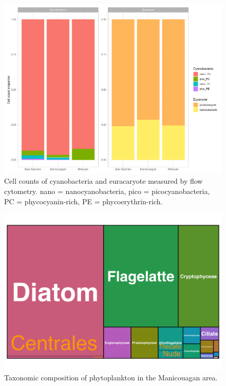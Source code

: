 \documentclass[essd, manuscript]{copernicus}
\begin{document}
\begin{figure}[t]
    \includegraphics[width=12cm]{Figures/barplot_flowcyto.png}
    \caption{Cell counts of cyanobacteria and euracaryote measured by flow cytometry. nano = nanocyanobacteria, pico =  picocyanobacteria, PC = phycocyanin-rich, PE = phycoerythrin-rich.}
    \label{fig:flowcyto}
\end{figure}

\begin{figure}[t]
    \includegraphics[width=12cm]{Figures/treemap_taxo.png}
    \caption{Taxonomic composition of phytoplankton in the Manicouagan area.}
    \label{fig:treemap}
\end{figure}
\end{document}
